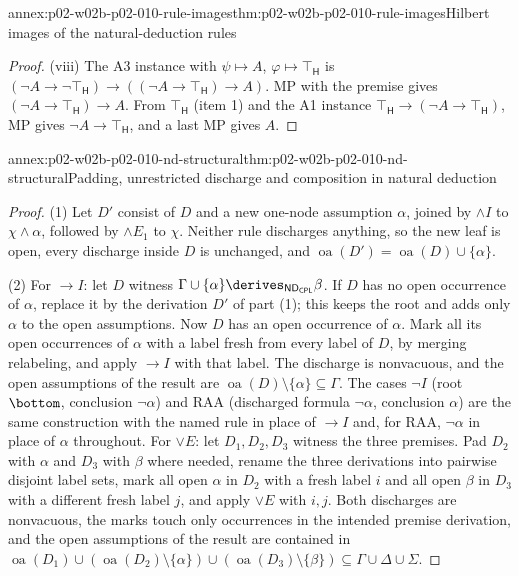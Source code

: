 \begin{annexitem}{annex:p02-w02b-p02-010-rule-images}{thm:p02-w02b-p02-010-rule-images}{Hilbert images of the natural-deduction rules}
\begin{proof}
(viii) The A3 instance with \(\psi\mapsto A\), \(\varphi\mapsto\top_{\mathsf H}\)
is \((\neg A\to\neg\top_{\mathsf H})\to((\neg A\to\top_{\mathsf H})\to A)\).
MP with the premise gives \((\neg A\to\top_{\mathsf H})\to A\).  From
\(\top_{\mathsf H}\) (item 1) and the A1 instance
\(\top_{\mathsf H}\to(\neg A\to\top_{\mathsf H})\), MP gives
\(\neg A\to\top_{\mathsf H}\), and a last MP gives \(A\).
\end{proof}
\end{annexitem}

\begin{annexitem}{annex:p02-w02b-p02-010-nd-structural}{thm:p02-w02b-p02-010-nd-structural}{Padding, unrestricted discharge and composition in natural deduction}
\begin{proof}
(1) Let \(D'\) consist of \(D\) and a new one-node assumption \(\alpha\),
joined by \(\land I\) to \(\chi\land\alpha\), followed by \(\land E_1\) to
\(\chi\).  Neither rule discharges anything, so the new leaf is open, every
discharge inside \(D\) is unchanged, and
\(\operatorname{oa}(D')=\operatorname{oa}(D)\cup\{\alpha\}\).

(2) For \(\to I\): let \(D\) witness
\(\Gamma\cup\{\alpha\}\derives_{\mathsf{ND}_{\mathsf{CPL}}}\beta\).  If \(D\)
has no open occurrence of \(\alpha\), replace it by the derivation \(D'\) of
part (1); this keeps the root and adds only \(\alpha\) to the open
assumptions.  Now \(D\) has an open occurrence of \(\alpha\).  Mark all its
open occurrences of \(\alpha\) with a label fresh from every label of \(D\),
by merging relabeling, and apply \(\to I\) with that label.  The discharge is
nonvacuous, and the open assumptions of the result are
\(\operatorname{oa}(D)\setminus\{\alpha\}\subseteq\Gamma\).  The cases
\(\neg I\) (root \(\bottom\), conclusion \(\neg\alpha\)) and RAA (discharged
formula \(\neg\alpha\), conclusion \(\alpha\)) are the same construction with
the named rule in place of \(\to I\) and, for RAA, \(\neg\alpha\) in place of
\(\alpha\) throughout.  For \(\lor E\): let \(D_1,D_2,D_3\) witness the three
premises.  Pad \(D_2\) with \(\alpha\) and \(D_3\) with \(\beta\) where
needed, rename the three derivations into pairwise disjoint label sets,
mark all open \(\alpha\) in \(D_2\) with a fresh label \(i\) and all open
\(\beta\) in \(D_3\) with a different fresh label \(j\), and apply \(\lor E\)
with \(i,j\).  Both discharges are nonvacuous, the marks touch only
occurrences in the intended premise derivation, and the open assumptions
of the result are contained in
\(\operatorname{oa}(D_1)\cup(\operatorname{oa}(D_2)\setminus\{\alpha\})
\cup(\operatorname{oa}(D_3)\setminus\{\beta\})\subseteq\Gamma\cup\Delta\cup\Sigma\).


\end{proof}
\end{annexitem}
